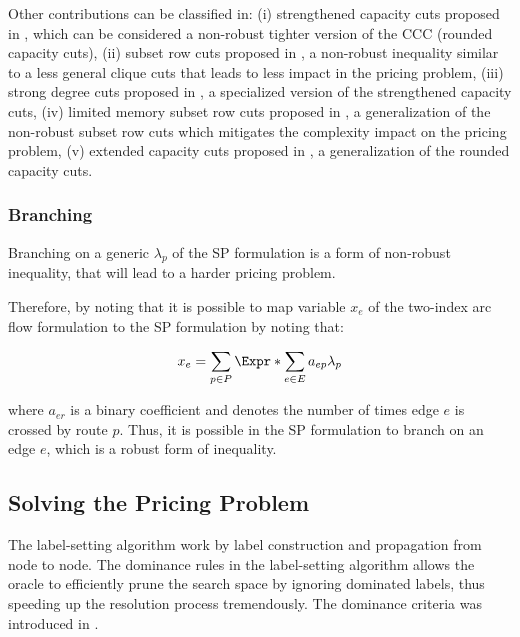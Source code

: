 Other contributions can be classified in:
(i) strengthened capacity cuts proposed in \textcite{baldacci2008}, which can be considered a
non-robust tighter version of the CCC (rounded capacity cuts),
(ii) subset row cuts proposed in \textcite{jepsen2008a}, a non-robust
inequality similar to a less general clique cuts that leads to less impact in the pricing problem,
(iii) strong degree cuts proposed in \textcite{contardo2011}, a specialized version
of the strengthened capacity cuts,
(iv) limited memory subset row cuts proposed in \textcite{pecin2017}, a generalization
of the non-robust subset row cuts which mitigates the complexity impact on the pricing problem,
(v) extended capacity cuts proposed in \textcite{pessoa2008a, pessoa2009}, a
generalization of the rounded capacity cuts.






\subsubsection{Branching}
Branching on a generic $\lambda_p$ of the SP formulation is a form of non-robust inequality,
that will lead to a harder pricing problem.

Therefore, by noting that it is possible to map variable $x_e$ of the two-index arc flow formulation
to the SP formulation by noting that:

\begin{equation}
	x_e = \sum_{p \in P} \Expr*{\sum_{e \in E} a_{ep}} \lambda_p
\end{equation}

where $a_{er}$ is a binary coefficient and denotes the number of times edge $e$ is
crossed by route $p$.
Thus, it is possible in the SP formulation to branch on an edge $e$, which
is a robust form of inequality.

\subsection{Solving the Pricing Problem}
\label{sec:intro-solving-the-pricing-problem}


The label-setting algorithm work by label construction and propagation from node to node.
The dominance rules in the label-setting algorithm allows the oracle
to efficiently prune the search space by ignoring dominated labels, thus speeding
up the resolution process tremendously.
The dominance criteria was introduced in \cite{feillet2004}.

